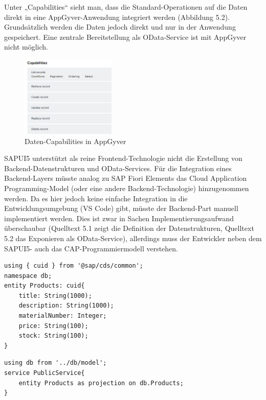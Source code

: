 Unter „Capabilities“ sieht man, dass die Standard-Operationen auf die Daten direkt in eine AppGyver-Anwendung integriert werden (Abbildung 5.2). Grundsätzlich werden die Daten jedoch direkt und nur in der Anwendung gespeichert. Eine zentrale Bereitstellung als OData-Service ist mit AppGyver nicht möglich.

\begin{figure}[!htbp]
 \centering
 \includegraphics[width=0.4\textwidth]{Bilder/appgyver/5_2_Capabilities.jpg}
 \caption{Daten-Capabilities in AppGyver}
\end{figure}

SAPUI5 unterstützt als reine Frontend-Technologie nicht die Erstellung von Backend-Datenstrukturen und OData-Services. Für die Integration eines Backend-Layers müsste analog zu SAP Fiori Elements das Cloud Application Programming-Model (oder eine andere Backend-Technologie) hinzugenommen werden. Da es hier jedoch keine einfache Integration in die Entwicklungsumgebung (VS Code) gibt, müsste der Backend-Part manuell implementiert werden. Dies ist zwar in Sachen Implementierungsaufwand überschaubar (Quelltext 5.1 zeigt die Definition der Datenstrukturen, Quelltext 5.2 das Exponieren als OData-Service), allerdings muss der Entwickler neben dem SAPUI5- auch das CAP-Programmiermodell verstehen.

\begin{lstlisting}[emph={using, entity, Products, title, description, materialNumber, price, stock, String},  caption=Datenmodellierung in der \texttt{model.cds}]
using { cuid } from '@sap/cds/common';
namespace db;
entity Products: cuid{
    title: String(1000);
    description: String(1000);
    materialNumber: Integer;
    price: String(100);
    stock: String(100);
}
\end{lstlisting}
\begin{lstlisting}[emph={using, entity, db, Products},  caption=Service Bereitstellung in der \texttt{public\_service.cds}]
using db from '../db/model';
service PublicService{
    entity Products as projection on db.Products;
}
\end{lstlisting}

